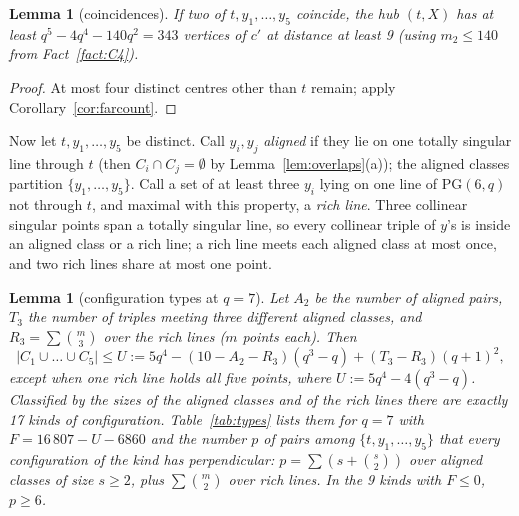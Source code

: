 \documentclass[11pt]{amsart}
\newtheorem{lemma}[theorem]{Lemma}
\theoremstyle{definition}
\theoremstyle{remark}
\numberwithin{equation}{section}
\newcommand{\PG}{\mathrm{PG}}
\begin{document}
\begin{lemma}[coincidences]\label{lem:coinc}
If two of $t,y_1,\dots,y_5$ coincide, the hub $(t,X)$ has at least $q^5-4q^4-140q^2=343$ vertices of $c'$ at distance at least
9 (using $m_2\le140$ from Fact~\ref{fact:C4}).
\end{lemma}

\begin{proof}
At most four distinct centres other than $t$ remain; apply Corollary~\ref{cor:farcount}.
\end{proof}

Now let $t,y_1,\dots,y_5$ be distinct. Call $y_i,y_j$ \emph{aligned} if they lie on one totally singular line through $t$ (then
$C_i\cap C_j=\emptyset$ by Lemma~\ref{lem:overlaps}(a)); the aligned classes partition $\{y_1,\dots,y_5\}$. Call a set of at
least three $y_i$ lying on one line of $\PG(6,q)$ not through $t$, and maximal with this property, a \emph{rich line}. Three
collinear singular points span a totally singular line, so every collinear triple of $y$'s is inside an aligned class or a
rich line; a rich line meets each aligned class at most once, and two rich lines share at most one point.

\begin{lemma}[configuration types at $q=7$]\label{lem:types}
Let $A_2$ be the number of aligned pairs, $T_3$ the number of triples meeting three different aligned classes, and
$R_3=\sum\binom m3$ over the rich lines ($m$ points each). Then
\[
|C_1\cup\dots\cup C_5|\le U:=5q^4-(10-A_2-R_3)(q^3-q)+(T_3-R_3)(q+1)^2,
\]
except when one rich line holds all five points, where $U:=5q^4-4(q^3-q)$. Classified by the sizes of the aligned classes and of
the rich lines there are exactly 17 kinds of configuration. Table~\ref{tab:types} lists them for $q=7$ with
$F=16\,807-U-6860$ and the number $p$ of pairs among $\{t,y_1,\dots,y_5\}$ that every configuration of the kind has
perpendicular: $p=\sum(s+\binom s2)$ over aligned classes of size $s\ge2$, plus $\sum\binom m2$ over rich lines. In the 9 kinds
with $F\le0$, $p\ge6$.
\end{lemma}
\end{document}
